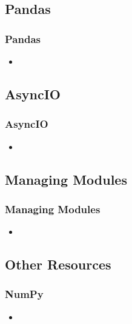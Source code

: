 \subsection{Pandas}
\begin{frame}
    \frametitle{Pandas}
    \vspace{5mm}
    
    \begin{itemize}
      \item 
    \end{itemize}
\end{frame}

\subsection{AsyncIO}
\begin{frame}
    \frametitle{AsyncIO}
    \vspace{5mm}
    
    \begin{itemize}
      \item 
    \end{itemize}
\end{frame}

\subsection{Managing Modules}
\begin{frame}
    \frametitle{Managing Modules}
    \vspace{5mm}
    
    \begin{itemize}
      \item 
    \end{itemize}
\end{frame}

\subsection{Other Resources}
\begin{frame}
    \frametitle{NumPy}
    \vspace{5mm}
    
    \begin{itemize}
      \item 
    \end{itemize}
\end{frame}


